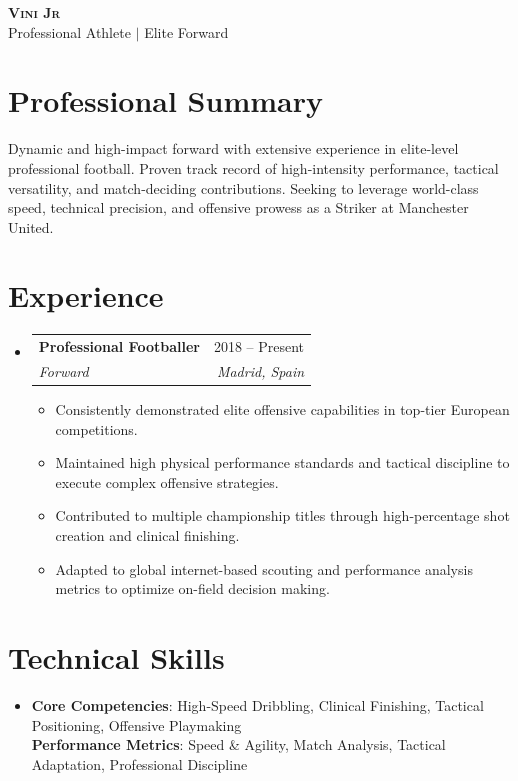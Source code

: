\documentclass[letterpaper,11pt]{article}
\makeatletter
\newcommand{\resumeItem}[1]{
\item\small{
{#1 \vspace{-2pt}}
}
}
\newcommand{\resumeSubheading}[4]{
\vspace{-2pt}\item
\begin{tabular*}{0.97\textwidth}[t]{l@{\extracolsep{\fill}}r}
\textbf{#1} & #2 \\
\textit{\small#3} & \textit{\small #4} \\
\end{tabular*}\vspace{-7pt}
}
\newcommand{\resumeSubHeadingListStart}{\begin{itemize}[leftmargin=0.15in, label={}]}
\newcommand{\resumeSubHeadingListEnd}{\end{itemize}}
\newcommand{\resumeItemListStart}{\begin{itemize}}
\newcommand{\resumeItemListEnd}{\end{itemize}\vspace{-5pt}}
\makeatother
\begin{document}
\begin{center}
\textbf{\Huge \scshape Vini Jr} \\ \vspace{1pt}
\small Professional Athlete $|$ Elite Forward
\end{center}

\section{Professional Summary}
Dynamic and high-impact forward with extensive experience in elite-level professional football. Proven track record of high-intensity performance, tactical versatility, and match-deciding contributions. Seeking to leverage world-class speed, technical precision, and offensive prowess as a Striker at Manchester United.

\section{Experience}
\resumeSubHeadingListStart
\resumeSubheading{Professional Footballer}{2018 -- Present}{Forward}{Madrid, Spain}
\resumeItemListStart
\resumeItem{Consistently demonstrated elite offensive capabilities in top-tier European competitions.}
\resumeItem{Maintained high physical performance standards and tactical discipline to execute complex offensive strategies.}
\resumeItem{Contributed to multiple championship titles through high-percentage shot creation and clinical finishing.}
\resumeItem{Adapted to global internet-based scouting and performance analysis metrics to optimize on-field decision making.}
\resumeItemListEnd
\resumeSubHeadingListEnd

\section{Technical Skills}
\begin{itemize}[leftmargin=0.15in, label={}]
\item{
\textbf{Core Competencies}{: High-Speed Dribbling, Clinical Finishing, Tactical Positioning, Offensive Playmaking} \\
\textbf{Performance Metrics}{: Speed \& Agility, Match Analysis, Tactical Adaptation, Professional Discipline}
}
\end{itemize}
\end{document}
